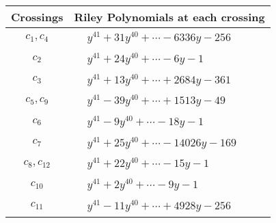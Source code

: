 \documentclass[1p]{elsarticle_modified}
\theoremstyle{definition}
\begin{document}
\begin{tabular}{m{50pt}|m{274pt}}
Crossings & \hspace{64pt}Riley Polynomials at each crossing \\
\hline $$\begin{aligned}c_{1},c_{4}\end{aligned}$$&$\begin{aligned}
&y^{41}+31 y^{40}+\cdots-6336 y-256
\end{aligned}$\\
\hline $$\begin{aligned}c_{2}\end{aligned}$$&$\begin{aligned}
&y^{41}+24 y^{40}+\cdots-6 y-1
\end{aligned}$\\
\hline $$\begin{aligned}c_{3}\end{aligned}$$&$\begin{aligned}
&y^{41}+13 y^{40}+\cdots+2684 y-361
\end{aligned}$\\
\hline $$\begin{aligned}c_{5},c_{9}\end{aligned}$$&$\begin{aligned}
&y^{41}-39 y^{40}+\cdots+1513 y-49
\end{aligned}$\\
\hline $$\begin{aligned}c_{6}\end{aligned}$$&$\begin{aligned}
&y^{41}-9 y^{40}+\cdots-18 y-1
\end{aligned}$\\
\hline $$\begin{aligned}c_{7}\end{aligned}$$&$\begin{aligned}
&y^{41}+25 y^{40}+\cdots-14026 y-169
\end{aligned}$\\
\hline $$\begin{aligned}c_{8},c_{12}\end{aligned}$$&$\begin{aligned}
&y^{41}+22 y^{40}+\cdots-15 y-1
\end{aligned}$\\
\hline $$\begin{aligned}c_{10}\end{aligned}$$&$\begin{aligned}
&y^{41}+2 y^{40}+\cdots-9 y-1
\end{aligned}$\\
\hline $$\begin{aligned}c_{11}\end{aligned}$$&$\begin{aligned}
&y^{41}-11 y^{40}+\cdots+4928 y-256
\end{aligned}$\\
\hline
\end{tabular}\\~\\
\end{document}

